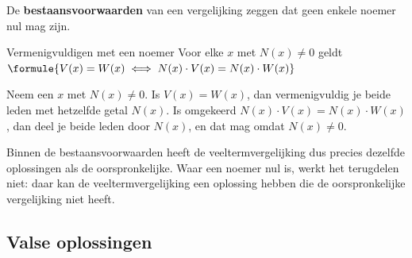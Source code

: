 \begin{theorie}
De \textbf{\textcolor{accent}{bestaansvoorwaarden}} van een vergelijking zeggen dat geen enkele noemer nul mag zijn.

\begin{stelling}{Vermenigvuldigen met een noemer}
Voor elke $x$ met $N(x) \neq 0$ geldt \quad $\formule{V(x) = W(x) \iff N(x) \cdot V(x) = N(x) \cdot W(x)}$
\end{stelling}

\begin{bewijs}
Neem een $x$ met $N(x) \neq 0$. Is $V(x) = W(x)$, dan vermenigvuldig je beide leden met hetzelfde getal $N(x)$. Is omgekeerd $N(x) \cdot V(x) = N(x) \cdot W(x)$, dan deel je beide leden door $N(x)$, en dat mag omdat $N(x) \neq 0$.
\end{bewijs}
\end{theorie}

Binnen de bestaansvoorwaarden heeft de veeltermvergelijking dus precies dezelfde oplossingen als de oorspronkelijke. Waar een noemer nul is, werkt het terugdelen niet: daar kan de veeltermvergelijking een oplossing hebben die de oorspronkelijke vergelijking niet heeft.


\begin{oefeningen}
\end{oefeningen}

\subsection{Valse oplossingen}

